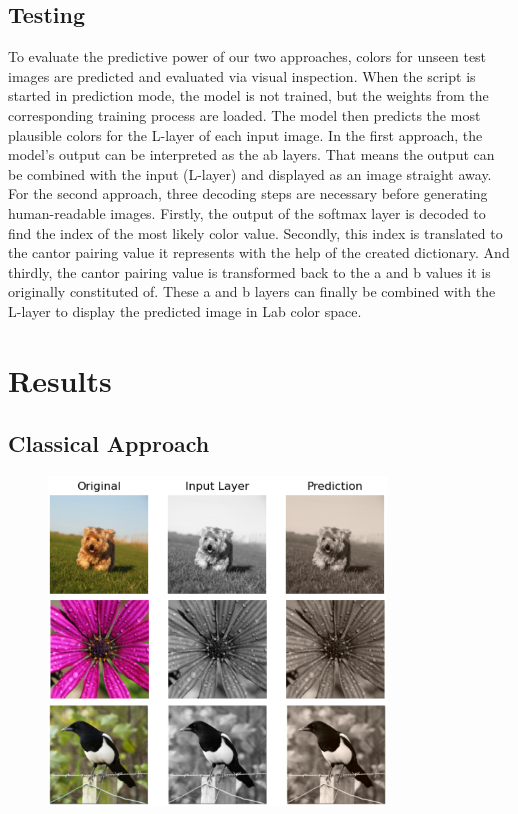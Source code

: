 \documentclass[12pt,letterpaper]{article}
\begin{document}
\subsection{Testing}
To evaluate the predictive power of our two approaches, colors for unseen test images are predicted and evaluated via visual inspection. When the script is started in prediction mode, the model is not trained, but the weights from the corresponding training process are loaded. The model then predicts the most plausible colors for the L-layer of each input image. In the first approach, the model's output can be interpreted as the ab layers. That means the output can be combined with the input (L-layer) and displayed as an image straight away. For the second approach, three decoding steps are necessary before generating human-readable images. Firstly, the output of the softmax layer is decoded to find the index of the most likely color value. Secondly, this index is translated to the cantor pairing value it represents with the help of the created dictionary. And thirdly, the cantor pairing value is transformed back to the a and b values it is originally constituted of. These a and b layers can finally be combined with the L-layer to display the predicted image in Lab color space.
\section{Results}
\subsection{Classical Approach}
\begin{figure}
	\centering
	\includegraphics[width=0.8\textwidth]{class_predict.png}
	\caption{}
	\label{class}
\end{figure}
\end{document}
